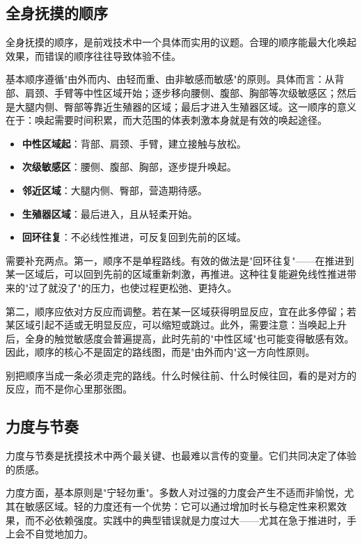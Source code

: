 \documentclass[12pt,UTF8]{ctexbook}
\newcommand{\keyword}[1]{\textbf{#1}}
\begin{document}
\subsection{全身抚摸的顺序}

全身抚摸的顺序，是前戏技术中一个具体而实用的议题。合理的顺序能最大化唤起效果，而错误的顺序往往导致体验不佳。

基本顺序遵循"由外而内、由轻而重、由非敏感而敏感"的原则。具体而言：从背部、肩颈、手臂等中性区域开始；逐步移向腰侧、腹部、胸部等次级敏感区；然后是大腿内侧、臀部等靠近生殖器的区域；最后才进入生殖器区域。这一顺序的意义在于：唤起需要时间积累，而大范围的体表刺激本身就是有效的唤起途径。

\begin{itemize}
	\item \keyword{中性区域起}：背部、肩颈、手臂，建立接触与放松。
	\item \keyword{次级敏感区}：腰侧、腹部、胸部，逐步提升唤起。
	\item \keyword{邻近区域}：大腿内侧、臀部，营造期待感。
	\item \keyword{生殖器区域}：最后进入，且从轻柔开始。
	\item \keyword{回环往复}：不必线性推进，可反复回到先前的区域。
\end{itemize}

需要补充两点。第一，顺序不是单程路线。有效的做法是"回环往复"——在推进到某一区域后，可以回到先前的区域重新刺激，再推进。这种往复能避免线性推进带来的"过了就没了"的压力，也使过程更松弛、更持久。

第二，顺序应依对方反应而调整。若在某一区域获得明显反应，宜在此多停留；若某区域引起不适或无明显反应，可以缩短或跳过。此外，需要注意：当唤起上升后，全身的触觉敏感度会普遍提高，此时先前的"中性区域"也可能变得敏感有效。因此，顺序的核心不是固定的路线图，而是"由外而内"这一方向性原则。

\begin{tcolorbox}[colback=pink!5!white,colframe=red!50!black,title=贴心小叮咛]
	别把顺序当成一条必须走完的路线。什么时候往前、什么时候往回，看的是对方的反应，而不是你心里那张图。
\end{tcolorbox}
\subsection{力度与节奏}

力度与节奏是抚摸技术中两个最关键、也最难以言传的变量。它们共同决定了体验的质感。

力度方面，基本原则是"宁轻勿重"。多数人对过强的力度会产生不适而非愉悦，尤其在敏感区域。轻的力度还有一个优势：它可以通过增加时长与稳定性来积累效果，而不必依赖强度。实践中的典型错误就是力度过大——尤其在急于推进时，手上会不自觉地加力。
\end{document}
